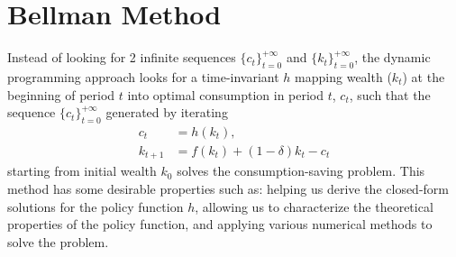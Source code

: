 \documentclass[11pt,a4paper]{book}
\theoremstyle{definition}\newtheorem{definition}{Definition}
\theoremstyle{definition}\newtheorem{fact}{Fact}
\theoremstyle{definition}\newtheorem{remark}{Remark}
\theoremstyle{definition}\newtheorem{ex}{Ex.}
\theoremstyle{definition}\newtheorem{project}{Project}
\theoremstyle{definition}\newtheorem{problem}{Problem}
\theoremstyle{definition}\newtheorem{example}{Example}
\numberwithin{theorem}{section}
\numberwithin{corollary}{chapter}
\numberwithin{assumption}{chapter}
\numberwithin{definition}{chapter}
\numberwithin{prop}{chapter}
\numberwithin{notation}{chapter}
\numberwithin{problem}{chapter}
\numberwithin{example}{chapter}
\numberwithin{fact}{chapter}
\numberwithin{ex}{chapter}
\begin{document}
	\section{Bellman Method}
	Instead of looking for 2 infinite sequences $\{c_t\}^{+\infty}_{t=0}$ and $\{k_t\}^{+\infty}_{t=0}$, the dynamic programming approach looks for a time-invariant  $h$ mapping wealth ($k_t$) at the beginning of period $t$ into optimal consumption in period $t$, $c_t$, such that the sequence $\{c_t\}^{+\infty}_{t=0}$ generated by iterating
	\begin{align}
		\label{bell_c} c_t &= h(k_t), \\
		\label{bell_k} k_{t+1} &= f(k_t) + (1-\delta)k_t - c_t
	\end{align}	
	starting from initial wealth $k_0$ solves the consumption-saving problem. This method has some desirable properties such as: helping us derive the closed-form solutions for the policy function $h$, allowing us to characterize the theoretical properties of the policy function, and applying various numerical methods to solve the problem.
	
\end{document}
